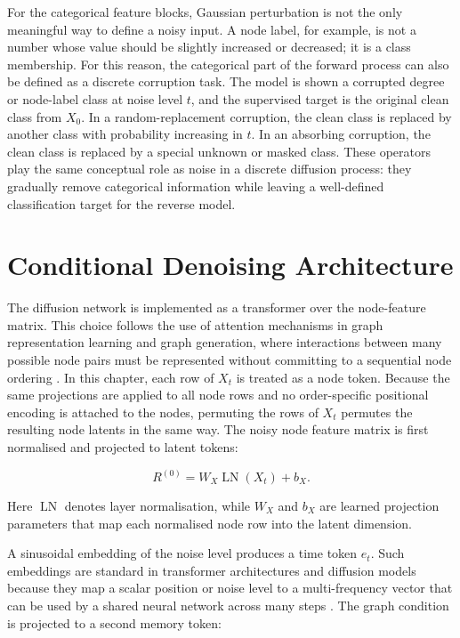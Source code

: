 For the categorical feature blocks, Gaussian perturbation is not the only
meaningful way to define a noisy input. A node label, for example, is not a
number whose value should be slightly increased or decreased; it is a class
membership. For this reason, the categorical part of the forward process can
also be defined as a discrete corruption task. The model is shown a corrupted
degree or node-label class at noise level \(t\), and the supervised target is
the original clean class from \(X_0\). In a random-replacement corruption, the
clean class is replaced by another class with probability increasing in \(t\).
In an absorbing corruption, the clean class is replaced by a special unknown or
masked class. These operators play the same conceptual role as noise in a
discrete diffusion process: they gradually remove categorical information while
leaving a well-defined classification target for the reverse model.

\section{Conditional Denoising Architecture}
\label{sec:generator:architecture}

The diffusion network is implemented as a transformer over the node-feature
matrix. This choice follows the use of
attention mechanisms in graph representation learning and graph generation,
where interactions between many possible node pairs must be represented without
committing to a sequential node ordering
\citep{vaswani2017attention,dwivedi2021graph,ying2021transformers,
rampavsek2022recipe,vignac2022digress}. In this chapter, each row of
\(X_t\) is treated as a node token. Because the same projections are applied to
all node rows and no order-specific positional encoding is attached to the
nodes, permuting the rows of \(X_t\) permutes the resulting node latents in the
same way. The noisy node feature matrix is first normalised and projected to
latent tokens:

\[
    R^{(0)} = W_X \operatorname{LN}(X_t) + b_X.
\]

Here \(\operatorname{LN}\) denotes layer normalisation, while \(W_X\) and
\(b_X\) are learned projection parameters that map each normalised node row
into the latent dimension.

A sinusoidal embedding of the noise level produces a time token \(e_t\). Such
embeddings are standard in transformer architectures and diffusion models
because they map a scalar position or noise level to a multi-frequency vector
that can be used by a shared neural network across many steps
\citep{vaswani2017attention,ho2020ddpm}. The graph condition is projected to a
second memory token:

